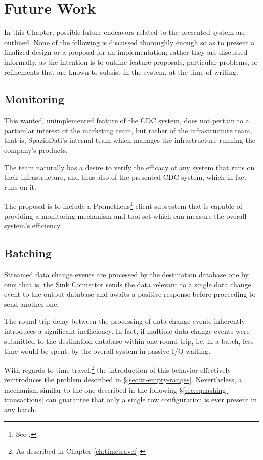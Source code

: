 \chapter{Future Work}
\label{ch:future}

In this Chapter, possible future endeavors related to the presented system are outlined.
None of the following is discussed thoroughly enough so as to present a finalized design or a proposal for an implementation; rather they are discussed informally, as the intention is to outline feature proposals, particular problems, or refinements that are known to subsist in the system, at the time of writing.


\section{Monitoring}

This wanted, unimplemented feature of the CDC system, does not pertain to a particular interest of the marketing team, but rather of the infrastructure team, that is, SpazioDati's internal team which manages the infrastructure running the company's products.

The team naturally has a desire to verify the efficacy of any system that runs on their infrastructure, and thus also of the presented CDC system, which in fact runs on it.

The proposal is to include a Prometheus\footnote{%
	See \cite{prometheus}.
} client subsystem that is capable of providing a monitoring mechanism and tool set which can measure the overall system's efficiency.


\section{Batching}
\label{sec:batching}

Streamed data change events are processed by the destination database one by one; that is, the Sink Connector sends the data relevant to a single data change event to the output database and awaits a positive response before proceeding to send another one.

The round-trip delay between the processing of data change events inherently introduces a significant inefficiency.
In fact, if multiple data change events were submitted to the destination database within one round-trip, i.e. in a batch, less time would be spent, by the overall system in passive I/O waiting.

With regards to time travel,\footnote{%
	As described in Chapter \ref{ch:timetravel}.
} the introduction of this behavior effectively reintroduces the problem described in \S \ref{sec:tt-empty-ranges}.
Nevertheless, a mechanism similar to the one described in the following \S \ref{sec:squashing-transactions} can guarantee that only a single row configuration is ever present in any batch.



